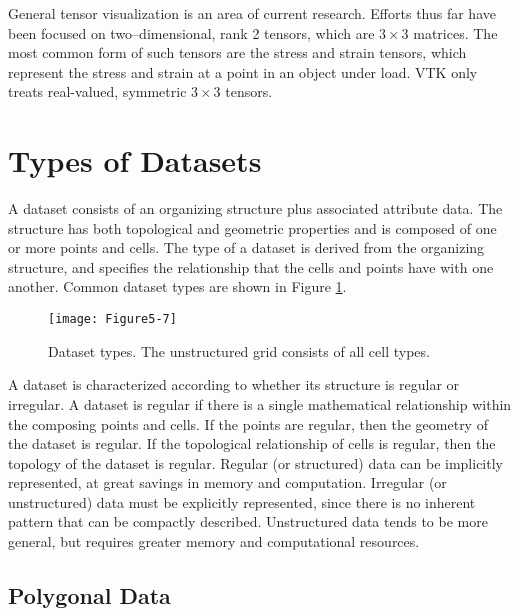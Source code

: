 \begin{description}[leftmargin=0cm,labelindent=0cm]
General tensor visualization is an area of current research. Efforts thus far have been focused on two--dimensional, rank 2 tensors, which are $3 \times 3$ matrices. The most common form of such tensors are the stress and strain tensors, which represent the stress and strain at a point in an object under load. VTK only treats real-valued, symmetric $3 \times 3$ tensors.

\end{description}


\section{Types of Datasets}
\label{sec:types_of_datasets}

A dataset consists of an organizing structure plus associated attribute data. The structure has both topological and geometric properties and is composed of one or more points and cells. The type of a dataset is derived from the organizing structure, and specifies the relationship that the cells and points have with one another. Common dataset types are shown in Figure \ref{fig:Figure5-7}.

\begin{figure}[!htb]
	\centering
	\texttt{[image: Figure5-7]}
	\caption{Dataset types. The unstructured grid consists of all cell types.}
	\label{fig:Figure5-7}
\end{figure}

A dataset is characterized according to whether its structure is regular or irregular. A dataset is regular if there is a single mathematical relationship within the composing points and cells. If the points are regular, then the geometry of the dataset is regular. If the topological relationship of cells is regular, then the topology of the dataset is regular. Regular (or structured) data can be implicitly represented, at great savings in memory and computation. Irregular (or unstructured) data must be explicitly represented, since there is no inherent pattern that can be compactly described. Unstructured data tends to be more general, but requires greater memory and computational resources.

\subsection{Polygonal Data}

